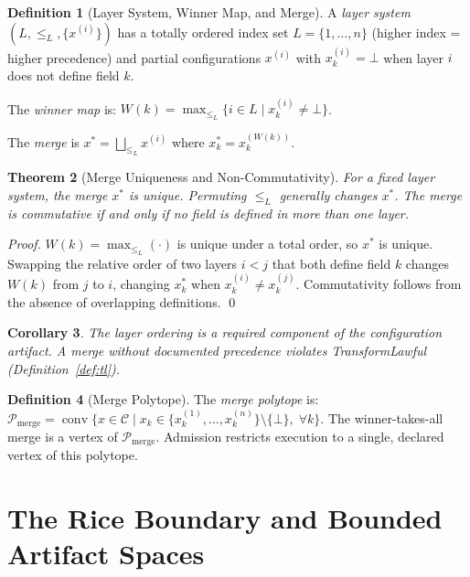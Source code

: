 \documentclass[12pt, letterpaper]{report}
\theoremstyle{plain}
\newtheorem{theorem}{Theorem}[chapter]
\newtheorem{corollary}[theorem]{Corollary}
\theoremstyle{definition}
\newtheorem{definition}[theorem]{Definition}
\theoremstyle{remark}
\DeclareMathOperator{\conv}{conv}
\newcommand{\CC}{\mathcal{C}}
\newcommand{\PP}{\mathcal{P}}
\begin{document}
\begin{definition}[Layer System, Winner Map, and Merge]
\label{def:merge}
A \emph{layer system} $(L, \leq_L, \{x^{(i)}\})$ has a totally ordered
index set $L = \{1, \ldots, n\}$ (higher index = higher precedence)
and partial configurations $x^{(i)}$ with $x^{(i)}_k = \bot$
when layer $i$ does not define field $k$.

The \emph{winner map} is:
$W(k) = \max_{\leq_L} \{ i \in L \mid x^{(i)}_k \neq \bot \}$.

The \emph{merge} is $x^* = \bigsqcup_{\leq_L} x^{(i)}$
where $x^*_k = x^{(W(k))}_k$.
\end{definition}

\begin{theorem}[Merge Uniqueness and Non-Commutativity]
\label{thm:merge}
For a fixed layer system, the merge $x^*$ is unique.
Permuting $\leq_L$ generally changes $x^*$.
The merge is commutative if and only if no field is defined in more than
one layer.
\end{theorem}

\begin{proof}
$W(k) = \max_{\leq_L}(\cdot)$ is unique under a total order, so $x^*$ is
unique. Swapping the relative order of two layers $i < j$ that both define
field $k$ changes $W(k)$ from $j$ to $i$, changing $x^*_k$ when
$x^{(i)}_k \neq x^{(j)}_k$. Commutativity follows from the absence of
overlapping definitions. \qed
\end{proof}

\begin{corollary}
The layer ordering is a required component of the configuration artifact.
A merge without documented precedence violates TransformLawful
(Definition~\ref{def:tl}).
\end{corollary}

\begin{definition}[Merge Polytope]
The \emph{merge polytope} is:
$\PP_{\mathrm{merge}} = \conv\{x \in \CC \mid x_k \in \{x^{(1)}_k, \ldots, x^{(n)}_k\} \setminus \{\bot\},\; \forall k\}$.
The winner-takes-all merge is a vertex of $\PP_{\mathrm{merge}}$.
Admission restricts execution to a single, declared vertex of this polytope.
\end{definition}

\chapter{The Rice Boundary and Bounded Artifact Spaces}
\label{ch:rice}
\end{document}

